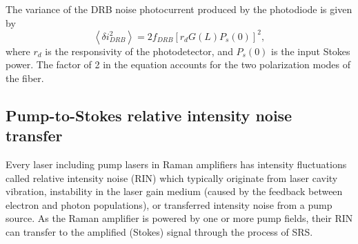 The variance of the DRB noise photocurrent produced by the photodiode is given by \cite{headley2005raman}
\begin{equation}
\left\langle \delta i_{DRB}^2\right\rangle = 2 f_{DRB} [r_d G(L) P_s(0)]^2,\label{eqn:JOSAA_Equation_9}
\end{equation}
where $r_d$ is the responsivity of the photodetector, and $P_s(0)$ is the input Stokes power. The factor of 2 in the equation accounts for the two polarization modes of the fiber.

\subsection{Pump-to-Stokes relative intensity noise transfer}

Every laser including pump lasers in Raman amplifiers has intensity fluctuations called relative intensity noise (RIN) which typically originate from laser cavity vibration, instability in the laser gain medium (caused by the feedback between electron and photon populations), or transferred intensity noise from a pump source. As the Raman amplifier is powered by one or more pump fields, their RIN can transfer to the amplified (Stokes) signal through the process of SRS.

